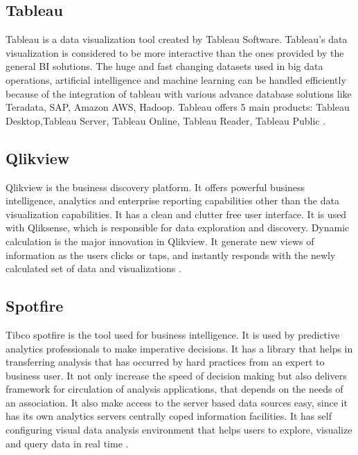 \subsection*{Tableau}

Tableau is a data visualization tool created by Tableau Software. Tableau’s data visualization is considered to be more interactive than the ones provided by the general BI solutions. The huge and fast changing datasets used in big data operations, artificial intelligence and machine learning can be handled efficiently because of the integration of tableau with various advance database solutions like Teradata, SAP, Amazon AWS, Hadoop. Tableau offers 5 main products: Tableau Desktop,Tableau Server, Tableau Online, Tableau Reader, Tableau Public \cite{Tableau}.\\

\subsection*{Qlikview}

Qlikview is the business discovery platform. It offers powerful business intelligence, analytics and enterprise reporting capabilities other than the data visualization capabilities. It has a clean and clutter free user interface. It is used with Qliksense, which is responsible for data exploration and discovery. Dynamic calculation is the major innovation in Qlikview. It generate new views of information as the users clicks or taps, and instantly responds with the newly calculated set of data and visualizations \cite{Qlikview}.

\subsection*{Spotfire}

Tibco spotfire is the tool used for business intelligence. It is used by predictive analytics professionals to make imperative decisions. It has a library that helps in transferring analysis that has occurred by hard practices from an expert to business user. It not only increase the speed of decision making but also delivers framework for circulation of analysis applications, that depends on the needs of an association. It also make access to the server based data sources easy, since it has its own analytics servers centrally coped information facilities. It has self configuring visual data analysis environment that helps users to explore, visualize and query data in real time \cite{Spotfire}.

